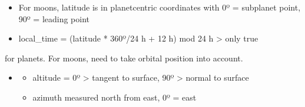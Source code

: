 \documentclass[letterpaper,10pt,english]{sphinxmanual}
\begin{document}
\begin{fulllineitems}
\begin{fulllineitems}
\begin{itemize}
\item {} 
\sphinxAtStartPar
For moons, latitude is in planet\sphinxhyphen{}centric coordinates with
0º = subplanet point, 90º = leading point

\item {} 
\sphinxAtStartPar
local\_time = (latitude * 360º/24 h + 12 h) mod 24 h \sphinxhyphen{}\textgreater{} only true

\end{itemize}

\sphinxAtStartPar
for planets. For moons, need to take orbital position into account.
\begin{itemize}
\item {} \begin{description}
\begin{itemize}
\item {} 
\sphinxAtStartPar
altitude = 0º \sphinxhyphen{}\textgreater{} tangent to surface, 90º \sphinxhyphen{}\textgreater{} normal to surface

\item {} 
\sphinxAtStartPar
azimuth measured north from east, 0º = east

\end{itemize}

\end{description}

\end{itemize}

\end{fulllineitems}


\begin{fulllineitems}
\label{\detokenize{nexoclom2/nexoclom2.particle_tracking.starting_point_old:nexoclom2.particle_tracking.starting_point_old.StartingPoint.__len__}}
\pysigstartsignatures
\pysiglinewithargsret
{}
{}
{}
\pysigstopsignatures
\end{fulllineitems}


\begin{fulllineitems}
\label{\detokenize{nexoclom2/nexoclom2.particle_tracking.starting_point_old:nexoclom2.particle_tracking.starting_point_old.StartingPoint.__module__}}
\pysigstartsignatures
\pysigline
{}
\pysigstopsignatures
\end{fulllineitems}


\end{fulllineitems}
\end{document}
